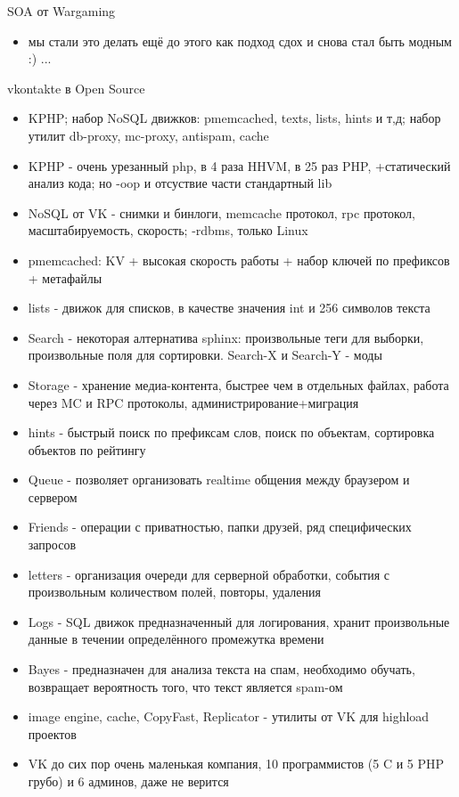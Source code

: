 \documentclass[aspectratio=169]{beamer}
\begin{document}
\begin{frame}{SOA от Wargaming}
\begin{itemize}
  \item мы стали это делать ещё до этого как подход сдох и снова стал быть модным :) ...
\end{itemize}
\end{frame}
  
\begin{frame}{vkontakte в Open Source}
\begin{itemize}
  \item KPHP; набор NoSQL движков: pmemcached, texts, lists, hints и т,д; набор утилит db-proxy, mc-proxy, antispam, cache
  \item KPHP - очень урезанный php, в 4 раза HHVM, в 25 раз PHP, +статический анализ кода; но -oop и отсуствие части стандартный lib
  \item NoSQL от VK - снимки и бинлоги, memcache протокол, rpc протокол, масштабируемость, скорость; -rdbms, только Linux
  \item pmemcached: KV + высокая скорость работы + набор ключей по префиксов + метафайлы
  \item lists - движок для списков, в качестве значения int и 256 символов текста
  \item Search - некоторая алтернатива sphinx: произвольные теги для выборки, произвольные поля для сортировки. Search-X и Search-Y - моды
  \item Storage - хранение медиа-контента, быстрее чем в отдельных файлах, работа через MC и RPC протоколы, администрирование+миграция
  \item hints - быстрый поиск по префиксам слов, поиск по объектам, сортировка объектов по рейтингу
  \item Queue - позволяет организовать realtime общения между браузером и сервером
  \item Friends - операции с приватностью, папки друзей, ряд специфических запросов
  \item letters - организация очереди для серверной обработки, события с произвольным количеством полей, повторы, удаления
  \item Logs - SQL движок предназначенный для логирования, хранит произвольные данные в течении определённого промежутка времени
  \item Bayes - предназначен для анализа текста на спам, необходимо обучать, возвращает вероятность того, что текст является spam-ом
  \item image engine, cache, CopyFast, Replicator - утилиты от VK для highload проектов
  \item VK до сих пор очень маленькая компания, 10 программистов (5 C и 5 PHP грубо) и 6 админов, даже не верится
\end{itemize}
\end{frame}
\end{document}
